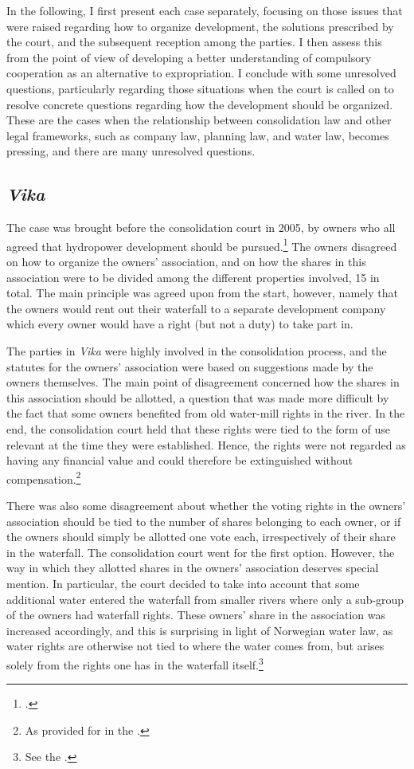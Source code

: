 In the following, I first present each case separately, focusing on those issues that were raised regarding how to organize development, the solutions prescribed by the court, and the subsequent reception among the parties. I then assess this from the point of view of developing a better understanding of compulsory cooperation as an alternative to expropriation. I conclude with some unresolved questions, particularly regarding those situations when the court is called on to resolve concrete questions regarding how the development should be organized. These are the cases when the relationship between consolidation law and other legal frameworks, such as company law, planning law, and water law, becomes pressing, and there are many unresolved questions.

\subsection{\emph{Vika}}

The case was brought before the consolidation court in 2005, by owners who all agreed that hydropower development should be pursued.\footcite{vika05} The owners disagreed on how to organize the owners' association, and on how the shares in this association were to be divided among the different properties involved, 15 in total. The main principle was agreed upon from the start, however, namely that the owners would rent out their waterfall to a separate development company which every owner would have a right (but not a duty) to take part in. 

The parties in \emph{Vika} were highly involved in the consolidation process, and the statutes for the owners' association were based on suggestions made by the owners themselves. The main point of disagreement concerned how the shares in this association should be allotted, a question that was made more difficult by the fact that some owners benefited from old water-mill rights in the river. In the end, the consolidation court held that these rights were tied to the form of use relevant at the time they were established. Hence, the rights were not regarded as having any financial value and could therefore be extinguished without compensation.\footnote{As provided for in the \cite[2|36|38]{lca79}.}

There was also some disagreement about whether the voting rights in the owners' association should be tied to the number of shares belonging to each owner, or if the owners should simply be allotted one vote each, irrespectively of their share in the waterfall. The consolidation court went for the first option. However, the way in which they allotted shares in the owners' association deserves special mention. In particular, the court decided to take into account that some additional water entered the waterfall from smaller rivers where only a sub-group of the owners had waterfall rights. These owners' share in the association was increased accordingly, and this is surprising in light of Norwegian water law, as water rights are otherwise not tied to where the water comes from, but arises solely from the rights one has in the waterfall itself.\footnote{See the \cite[13]{wra00}.}

